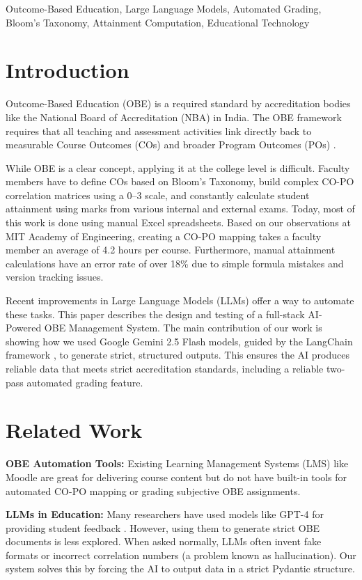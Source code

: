 \documentclass[conference]{IEEEtran}
\begin{document}
\begin{IEEEkeywords}
Outcome-Based Education, Large Language Models, Automated Grading, Bloom's Taxonomy, Attainment Computation, Educational Technology
\end{IEEEkeywords}

\section{Introduction}
Outcome-Based Education (OBE) is a required standard by accreditation bodies like the National Board of Accreditation (NBA) in India. The OBE framework requires that all teaching and assessment activities link directly back to measurable Course Outcomes (COs) and broader Program Outcomes (POs) \cite{6}.

While OBE is a clear concept, applying it at the college level is difficult. Faculty members have to define COs based on Bloom’s Taxonomy, build complex CO-PO correlation matrices using a 0–3 scale, and constantly calculate student attainment using marks from various internal and external exams. Today, most of this work is done using manual Excel spreadsheets. Based on our observations at MIT Academy of Engineering, creating a CO-PO mapping takes a faculty member an average of 4.2 hours per course. Furthermore, manual attainment calculations have an error rate of over 18\% due to simple formula mistakes and version tracking issues.

Recent improvements in Large Language Models (LLMs) offer a way to automate these tasks. This paper describes the design and testing of a full-stack AI-Powered OBE Management System. The main contribution of our work is showing how we used Google Gemini 2.5 Flash models, guided by the LangChain framework \cite{8}, to generate strict, structured outputs. This ensures the AI produces reliable data that meets strict accreditation standards, including a reliable two-pass automated grading feature.

\section{Related Work}
\textbf{OBE Automation Tools:} Existing Learning Management Systems (LMS) like Moodle \cite{1} are great for delivering course content but do not have built-in tools for automated CO-PO mapping or grading subjective OBE assignments.

\textbf{LLMs in Education:} Many researchers have used models like GPT-4 for providing student feedback \cite{2, 3}. However, using them to generate strict OBE documents is less explored. When asked normally, LLMs often invent fake formats or incorrect correlation numbers (a problem known as hallucination). Our system solves this by forcing the AI to output data in a strict Pydantic structure.
\end{document}
